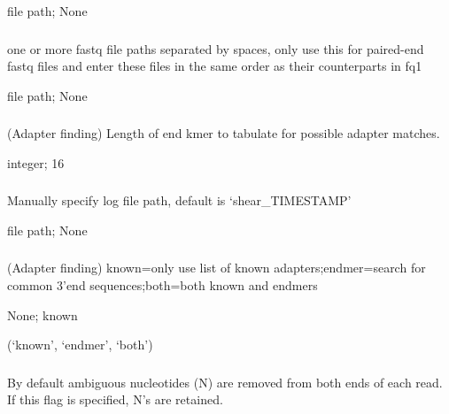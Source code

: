\documentclass[letterpaper,10pt,english]{sphinxmanual}
\begin{document}
 file path;  None


\subsubsection{}
\label{\detokenize{prog_desc:id5}}
 one or more fastq file paths separated by spaces, only use this for paired-end fastq files and enter these files in the same order as their counterparts in \textendash{}fq1

 file path;  None


\subsubsection{}
\label{\detokenize{prog_desc:k-adapter-end-klength}}
 (Adapter finding) Length of end kmer to tabulate for possible adapter matches.

 integer;  16


\subsubsection{}
\label{\detokenize{prog_desc:log-path}}
 Manually specify log file path, default is ‘shear\_TIMESTAMP’

 file path;  None


\subsubsection{}
\label{\detokenize{prog_desc:m-adapter-mode}}
 (Adapter finding) known=only use list of known adapters;endmer=search for common 3’end sequences;both=both known and endmers

 None;  known

 (‘known’, ‘endmer’, ‘both’)


\subsubsection{}
\label{\detokenize{prog_desc:n-retain-ambig}}
 By default ambiguous nucleotides (N) are removed from both ends of each read. If this flag is specified, N’s are retained.
\end{document}
